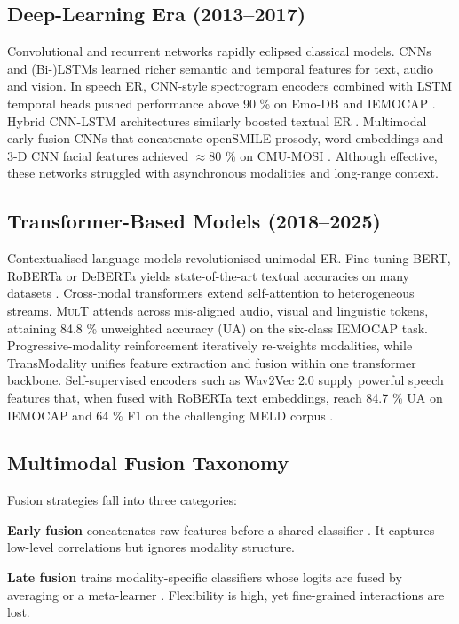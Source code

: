 \documentclass[12pt]{article}
\begin{document}
\subsection{Deep-Learning Era (2013–2017)}
Convolutional and recurrent networks rapidly eclipsed classical models.
CNNs and \mbox{(Bi-)LSTMs} learned richer semantic and temporal features
for text, audio and vision.  In speech ER, CNN-style spectrogram
encoders combined with LSTM temporal heads pushed performance above
90 \% on Emo-DB and IEMOCAP \cite{mao2014learning}.  Hybrid CNN-LSTM
architectures similarly boosted textual ER
\cite{abdul2017emonet}.  Multimodal early-fusion CNNs that concatenate
openSMILE prosody, word embeddings and 3-D CNN facial features achieved
$\approx$80 \% on CMU-MOSI \cite{poria2018multimodal}.  Although
effective, these networks struggled with asynchronous modalities and
long-range context.

\subsection{Transformer-Based Models (2018–2025)}
Contextualised language models revolutionised unimodal ER.  Fine-tuning
BERT, RoBERTa or DeBERTa yields state-of-the-art textual accuracies on
many datasets \cite{liu2019roberta}.  Cross-modal transformers extend
self-attention to heterogeneous streams.  \textsc{MulT}
\cite{tsai2019mult} attends across mis-aligned audio, visual and
linguistic tokens, attaining 84.8 \% unweighted accuracy (UA) on the
six-class IEMOCAP task.  Progressive-modality reinforcement
\cite{lv2021progressive} iteratively re-weights modalities, while
TransModality \cite{wang2020context} unifies feature extraction and
fusion within one transformer backbone.  Self-supervised encoders such
as Wav2Vec 2.0 supply powerful speech features that, when fused with
RoBERTa text embeddings, reach 84.7 \% UA on IEMOCAP and 64 \% F1 on the
challenging MELD corpus \cite{siriwardhana2020joint}.

\subsection{Multimodal Fusion Taxonomy}
Fusion strategies fall into three categories:

\textbf{Early fusion} concatenates raw features before a shared
classifier \cite{poria2017review}.  It captures low-level correlations
but ignores modality structure.

\textbf{Late fusion} trains modality-specific classifiers whose logits
are fused by averaging or a meta-learner
\cite{wang2019words}.  Flexibility is high, yet fine-grained
interactions are lost.
\end{document}
